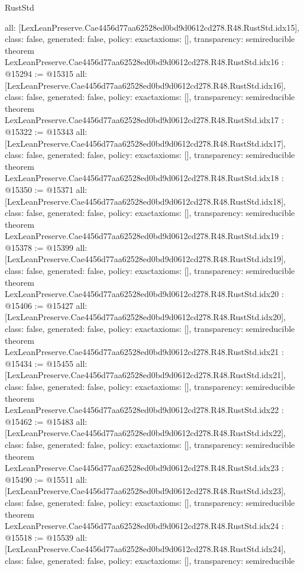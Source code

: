 \begin{lexlean}{RustStd}
\begin{coremodule}
{  all: [LexLeanPreserve.Cae4456d77aa62528ed0bd9d0612cd278.R48.RustStd.idx15],
  class: false,
  generated: false,
  policy: exact{axioms: []},
  transparency: semireducible
}
theorem LexLeanPreserve.Cae4456d77aa62528ed0bd9d0612cd278.R48.RustStd.idx16 : @15294 := @15315 {
  all: [LexLeanPreserve.Cae4456d77aa62528ed0bd9d0612cd278.R48.RustStd.idx16],
  class: false,
  generated: false,
  policy: exact{axioms: []},
  transparency: semireducible
}
theorem LexLeanPreserve.Cae4456d77aa62528ed0bd9d0612cd278.R48.RustStd.idx17 : @15322 := @15343 {
  all: [LexLeanPreserve.Cae4456d77aa62528ed0bd9d0612cd278.R48.RustStd.idx17],
  class: false,
  generated: false,
  policy: exact{axioms: []},
  transparency: semireducible
}
theorem LexLeanPreserve.Cae4456d77aa62528ed0bd9d0612cd278.R48.RustStd.idx18 : @15350 := @15371 {
  all: [LexLeanPreserve.Cae4456d77aa62528ed0bd9d0612cd278.R48.RustStd.idx18],
  class: false,
  generated: false,
  policy: exact{axioms: []},
  transparency: semireducible
}
theorem LexLeanPreserve.Cae4456d77aa62528ed0bd9d0612cd278.R48.RustStd.idx19 : @15378 := @15399 {
  all: [LexLeanPreserve.Cae4456d77aa62528ed0bd9d0612cd278.R48.RustStd.idx19],
  class: false,
  generated: false,
  policy: exact{axioms: []},
  transparency: semireducible
}
theorem LexLeanPreserve.Cae4456d77aa62528ed0bd9d0612cd278.R48.RustStd.idx20 : @15406 := @15427 {
  all: [LexLeanPreserve.Cae4456d77aa62528ed0bd9d0612cd278.R48.RustStd.idx20],
  class: false,
  generated: false,
  policy: exact{axioms: []},
  transparency: semireducible
}
theorem LexLeanPreserve.Cae4456d77aa62528ed0bd9d0612cd278.R48.RustStd.idx21 : @15434 := @15455 {
  all: [LexLeanPreserve.Cae4456d77aa62528ed0bd9d0612cd278.R48.RustStd.idx21],
  class: false,
  generated: false,
  policy: exact{axioms: []},
  transparency: semireducible
}
theorem LexLeanPreserve.Cae4456d77aa62528ed0bd9d0612cd278.R48.RustStd.idx22 : @15462 := @15483 {
  all: [LexLeanPreserve.Cae4456d77aa62528ed0bd9d0612cd278.R48.RustStd.idx22],
  class: false,
  generated: false,
  policy: exact{axioms: []},
  transparency: semireducible
}
theorem LexLeanPreserve.Cae4456d77aa62528ed0bd9d0612cd278.R48.RustStd.idx23 : @15490 := @15511 {
  all: [LexLeanPreserve.Cae4456d77aa62528ed0bd9d0612cd278.R48.RustStd.idx23],
  class: false,
  generated: false,
  policy: exact{axioms: []},
  transparency: semireducible
}
theorem LexLeanPreserve.Cae4456d77aa62528ed0bd9d0612cd278.R48.RustStd.idx24 : @15518 := @15539 {
  all: [LexLeanPreserve.Cae4456d77aa62528ed0bd9d0612cd278.R48.RustStd.idx24],
  class: false,
  generated: false,
  policy: exact{axioms: []},
  transparency: semireducible
}
\end{coremodule}
\end{lexlean}
